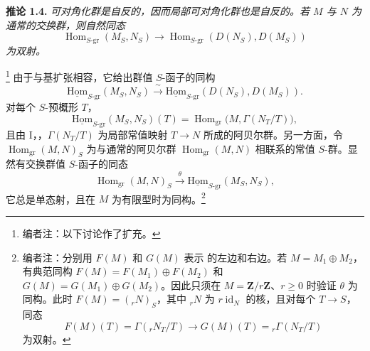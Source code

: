 
\medskip
\noindent{}\textbf{推论 1.4.}
\textit{可对角化群是自反的，因而局部可对角化群也是自反的。若 \(M\) 与 \(N\) 为通常的交换群，则自然同态}
\[
  \operatorname{Hom}_{S\text{-}\mathrm{gr}}(M_S,N_S)
  \longrightarrow
  \operatorname{Hom}_{S\text{-}\mathrm{gr}}(D(N_S),D(M_S))
\]
\textit{为双射。}

\footnote{编者注：以下讨论作了扩充。}
由于与基扩张相容，它给出群值 \(S\)-函子的同构
\begin{equation}
  \tag{1}
  \operatorname{\underline{Hom}}_{S\text{-}\mathrm{gr}}(M_S,N_S)
  \xrightarrow{\ \sim\ }
  \operatorname{\underline{Hom}}_{S\text{-}\mathrm{gr}}
    (D(N_S),D(M_S)).
\end{equation}
对每个 \(S\)-预概形 \(T\)，
\[
  \operatorname{\underline{Hom}}_{S\text{-}\mathrm{gr}}(M_S,N_S)(T)
  =
  \operatorname{Hom}_{\mathrm{gr}}\bigl(M,\Gamma(N_T/T)\bigr),
\]
且由 I，，\(\Gamma(N_T/T)\) 为局部常值映射 \(T\to N\) 所成的阿贝尔群。另一方面，令 \(\operatorname{Hom}_{\mathrm{gr}}(M,N)_S\) 为与通常的阿贝尔群 \(\operatorname{Hom}_{\mathrm{gr}}(M,N)\) 相联系的常值 \(S\)-群。显然有交换群值 \(S\)-函子的同态
\begin{equation}
  \tag{2}
  \operatorname{Hom}_{\mathrm{gr}}(M,N)_S
  \xrightarrow{\ \theta\ }
  \operatorname{\underline{Hom}}_{S\text{-}\mathrm{gr}}(M_S,N_S),
\end{equation}
它总是单态射，且在 \(M\) 为有限型时为同构。\footnote{编者注：分别用 \(F(M)\) 和 \(G(M)\) 表示  的左边和右边。若 \(M=M_1\oplus M_2\)，有典范同构 \(F(M)=F(M_1)\oplus F(M_2)\) 和 \(G(M)=G(M_1)\oplus G(M_2)\)。因此只须在 \(M=\mathbf Z/r\mathbf Z\)、\(r\geq0\) 时验证 \(\theta\) 为同构。此时 \(F(M)=({}_rN)_S\)，其中 \({}_rN\) 为 \(r\operatorname{id}_N\) 的核，且对每个 \(T\to S\)，同态
\[
  F(M)(T)=\Gamma({}_rN_T/T)
  \longrightarrow
  G(M)(T)={}_r\Gamma(N_T/T)
\]
为双射。}

